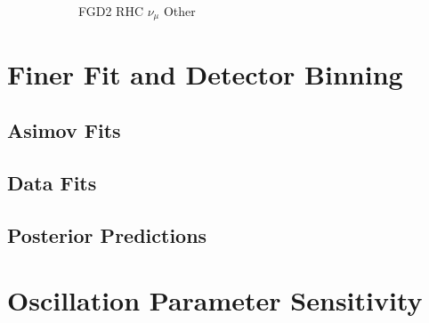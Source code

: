\begin{figure}
\begin{subfigure}{.32\textwidth}
  \caption{FGD2 RHC $\nu_{\mu}$ Other}
  \label{fig:priorpred_FGD2_NuMuBkg_CCOther_in_AntiNu_Mode}
\end{subfigure}
\caption{}
\label{fig:postpreds}
\end{figure}


\section{Finer Fit and Detector Binning}\label{sec:newbin}
\subsection{Asimov Fits}
\subsection{Data Fits}
\subsection{Posterior Predictions}
\section{Oscillation Parameter Sensitivity}

\newpage
